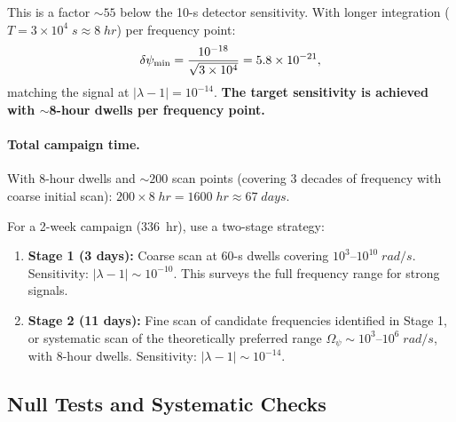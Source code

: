 \documentclass[aps,prd,twocolumn,superscriptaddress,floatfix,nofootinbib]{revtex4-2}
\newcommand{\Opsi}{\Omega_\psi}
\newcommand{\lam}{\lambda}
\begin{document}
This is a factor $\sim 55$ below the 10-s detector sensitivity. With
longer integration ($T = 3\times10^4\;\si{s} \approx 8\;\si{hr}$) per
frequency point:
\begin{equation}
\delta\psi_{\rm min} = \frac{10^{-18}}{\sqrt{3\times10^4}}
= 5.8\times10^{-21},
\end{equation}
matching the signal at $|\lam-1| = 10^{-14}$. \textbf{The target
sensitivity is achieved with $\sim$8-hour dwells per frequency point.}

\paragraph{Total campaign time.}
With 8-hour dwells and $\sim 200$ scan points (covering 3 decades of
frequency with coarse initial scan):
$200 \times 8\;\si{hr} = 1600\;\si{hr} \approx 67\;\si{days}$.

For a 2-week campaign (336~hr), use a two-stage strategy:
\begin{enumerate}
\item \textbf{Stage 1 (3 days):} Coarse scan at 60-s dwells covering
$10^3$--$10^{10}\;\si{rad/s}$. Sensitivity: $|\lam-1| \sim 10^{-10}$.
This surveys the full frequency range for strong signals.
\item \textbf{Stage 2 (11 days):} Fine scan of candidate frequencies
identified in Stage 1, or systematic scan of the theoretically
preferred range $\Opsi \sim 10^3$--$10^6\;\si{rad/s}$, with
8-hour dwells. Sensitivity: $|\lam-1| \sim 10^{-14}$.
\end{enumerate}

\subsection{Null Tests and Systematic Checks}\label{sec:nulls}
\end{document}
